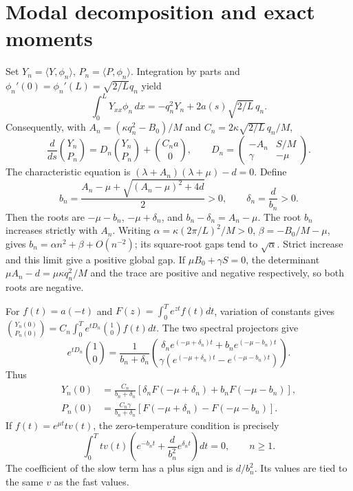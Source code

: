 \section{Modal decomposition and exact moments}\label{sec:modal}
Set \(Y_n=\langle Y,\phi_n\rangle\), \(P_n=\langle P,\phi_n\rangle\). Integration by parts and \(\phi_n'(0)=\phi_n'(L)=\sqrt{2/L}q_n\) yield
\begin{equation}\label{eq:ibp}
\int_0^L Y_{xx}\phi_n\,dx=-q_n^2Y_n+2a(s)\sqrt{2/L}\,q_n.
\end{equation}
Consequently, with \(A_n=(\kappa q_n^2-B_0)/M\) and \(C_n=2\kappa\sqrt{2/L}\,q_n/M\),
\begin{equation}\label{eq:modalode}
\frac d{ds}\binom{Y_n}{P_n}=D_n\binom{Y_n}{P_n}+\binom{C_na}{0},\qquad
D_n=\begin{pmatrix}-A_n&S/M\\\gamma&-\mu\end{pmatrix}.
\end{equation}
The characteristic equation is \((\lambda+A_n)(\lambda+\mu)-d=0\). Define
\begin{equation}\label{eq:roots}
b_n=\frac{A_n-\mu+\sqrt{(A_n-\mu)^2+4d}}2>0,\qquad \delta_n=\frac d{b_n}>0.
\end{equation}
Then the roots are \(-\mu-b_n\), \(-\mu+\delta_n\), and \(b_n-\delta_n=A_n-\mu\). The root \(b_n\) increases strictly with \(A_n\). Writing \(\alpha=\kappa(2\pi/L)^2/M>0\), \(\beta=-B_0/M-\mu\), gives \(b_n=\alpha n^2+\beta+O(n^{-2})\); its square-root gaps tend to \(\sqrt\alpha\). Strict increase and this limit give a positive global gap. If \(\mu B_0+\gamma S=0\), the determinant \(\mu A_n-d=\mu\kappa q_n^2/M\) and the trace are positive and negative respectively, so both roots are negative.

For \(f(t)=a(-t)\) and \(F(z)=\int_0^T e^{zt}f(t)dt\), variation of constants gives \(\binom{Y_n(0)}{P_n(0)}=C_n\int_0^T e^{tD_n}\binom10 f(t)dt\). The two spectral projectors give
\begin{equation}\label{eq:projector}
e^{tD_n}\binom10=\frac1{b_n+\delta_n}
\binom{\delta_ne^{(-\mu+\delta_n)t}+b_ne^{(-\mu-b_n)t}}
{\gamma(e^{(-\mu+\delta_n)t}-e^{(-\mu-b_n)t})}.
\end{equation}
Thus
\begin{align}
Y_n(0)&=\frac{C_n}{b_n+\delta_n}\left[\delta_nF(-\mu+\delta_n)+b_nF(-\mu-b_n)\right],\label{eq:Ymodal}\\
P_n(0)&=\frac{C_n\gamma}{b_n+\delta_n}\left[F(-\mu+\delta_n)-F(-\mu-b_n)\right].\label{eq:Pmodal}
\end{align}
If \(f(t)=e^{\mu t}t v(t)\), the zero-temperature condition is precisely
\begin{equation}\label{eq:paired}
\int_0^T t v(t)\left(e^{-b_nt}+\frac d{b_n^2}e^{\delta_nt}\right)dt=0,\qquad n\ge1.
\end{equation}
The coefficient of the slow term has a plus sign and is \(d/b_n^2\). Its values are tied to the same \(v\) as the fast values.
